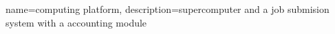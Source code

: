 {
	name={computing platform},
	description={supercomputer and a job submision system with a accounting module}
}